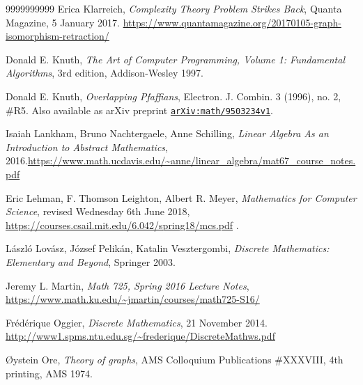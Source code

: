 \documentclass[numbers=enddot,12pt,final,onecolumn,notitlepage]{scrartcl}%
\theoremstyle{definition}
\newcommand\arxiv[1]{\href{http://www.arxiv.org/abs/#1}{\texttt{arXiv:#1}}}
\begin{document}
\begin{thebibliography}{9999999999}
Erica Klarreich,
\textit{Complexity Theory Problem Strikes Back},
Quanta Magazine, 5 January 2017.
\newline \url{https://www.quantamagazine.org/20170105-graph-isomorphism-retraction/}

Donald E. Knuth,
\textit{The Art of Computer Programming, Volume 1: Fundamental
Algorithms},
3rd edition, Addison-Wesley 1997.

 Donald E. Knuth,
\textit{Overlapping Pfaffians},
Electron. J. Combin. 3 (1996), no. 2, \#R5.
Also available as arXiv preprint \arxiv{math/9503234v1}.


Isaiah Lankham, Bruno Nachtergaele, Anne
Schilling, \textit{Linear Algebra As an Introduction to Abstract Mathematics},
2016.\newline\url{https://www.math.ucdavis.edu/~anne/linear_algebra/mat67_course_notes.pdf}

Eric Lehman, F. Thomson Leighton, Albert R. Meyer,
\textit{Mathematics for Computer Science},
revised Wednesday 6th June 2018,
\newline\url{https://courses.csail.mit.edu/6.042/spring18/mcs.pdf} .

L\'aszl\'o Lov\'asz, J\'ozsef Pelik\'an,
Katalin Vesztergombi,
\textit{Discrete Mathematics: Elementary and Beyond},
Springer 2003.

Jeremy L. Martin,
\textit{Math 725, Spring 2016 Lecture Notes},
\newline\url{https://www.math.ku.edu/~jmartin/courses/math725-S16/}


Fr\'ed\'erique Oggier,
\textit{Discrete Mathematics},
21 November 2014.
\newline\url{http://www1.spms.ntu.edu.sg/~frederique/DiscreteMathws.pdf}

\O ystein Ore, \textit{Theory of graphs},
AMS Colloquium Publications \#XXXVIII,
4th printing, AMS 1974.


\end{thebibliography}
\end{document}
